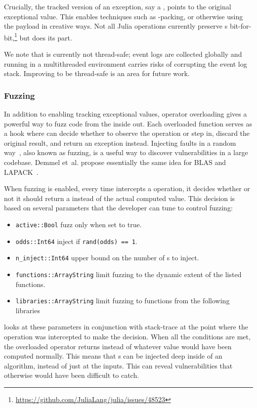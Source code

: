 \documentclass{juliacon}
\begin{document}
Crucially, the tracked version of an exception, say a \NaN{}, points
to the original exceptional value.
This enables techniques such as \NaN{}-packing, or otherwise
using the payload in creative ways.
Not all Julia operations currently preserve \NaN{}s
bit-for-bit,\footnote{\url{https://github.com/JuliaLang/julia/issues/48523}}
but \FT{} does its part.

We note that \FT{} is currently not thread-safe; event logs are
collected globally and running \FT{} in a multithreaded environment
carries risks of corrupting the event log stack.
Improving \FT{} to be thread-safe is an area for future work.


\subsubsection{Fuzzing}

In addition to enabling tracking exceptional values, operator
overloading gives \FT{} a powerful way to fuzz code from the inside
out.
Each overloaded function serves as a hook where \FT{} can decide whether to observe
the operation or step in, discard the original result, and return an exception instead.
Injecting faults in a random way~\cite{hamlet1994random}, also known as fuzzing,
is a useful way to discover vulnerabilities in a large codebase.
Demmel et~al. propose essentially the same idea for BLAS and
LAPACK~\cite{ddghlllprr-correctness-2022}.

When fuzzing is enabled, every time \FT{} intercepts a \fp{}
operation, it decides whether or not it should return a \Nan{} instead
of the actual computed value.
This decision is based on several parameters that the developer can
tune to control fuzzing:

\begin{itemize}
\item \texttt{active::Bool} fuzz only when set to true.
\item \texttt{odds::Int64} inject if \texttt{rand(odds) == 1}.
\item \texttt{n\_inject::Int64} upper bound on the number of \Nan{}s to inject.
\item \texttt{functions::Array{String}} limit fuzzing to the dynamic extent of the listed functions.
\item \texttt{libraries::Array{String}} limit fuzzing to functions from the following libraries
\end{itemize}

\FT{} looks at these parameters in conjunction with stack-trace at the
point where the operation was intercepted to make the decision.
When all the conditions are met, the overloaded operator returns
\Nan{} instead of whatever value would have been computed normally.
This means that \Nan{}s can be injected deep inside of an algorithm,
instead of just at the inputs.
This can reveal vulnerabilities that otherwise would have been
difficult to catch.
\end{document}
